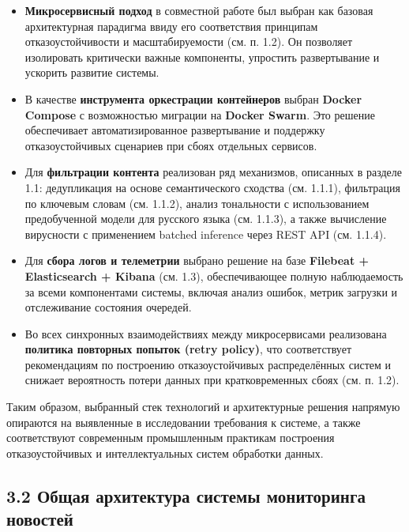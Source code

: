 \begin{itemize}
\tightlist
\item
  \textbf{Микросервисный подход} в совместной работе был выбран как
  базовая архитектурная парадигма ввиду его соответствия принципам
  отказоустойчивости и масштабируемости (см. п. 1.2). Он позволяет
  изолировать критически важные компоненты, упростить развертывание и
  ускорить развитие системы.\\
\item
  В качестве \textbf{инструмента оркестрации контейнеров} выбран
  \textbf{Docker Compose} с возможностью миграции на \textbf{Docker
  Swarm}. Это решение обеспечивает автоматизированное развертывание и
  поддержку отказоустойчивых сценариев при сбоях отдельных сервисов.\\
\item
  Для \textbf{фильтрации контента} реализован ряд механизмов, описанных
  в разделе 1.1: дедупликация на основе семантического сходства (см.
  1.1.1), фильтрация по ключевым словам (см. 1.1.2), анализ тональности
  с использованием предобученной модели для русского языка (см. 1.1.3),
  а также вычисление вирусности с применением batched inference через
  REST API (см. 1.1.4).\\
\item
  Для \textbf{сбора логов и телеметрии} выбрано решение на базе
  \textbf{Filebeat + Elasticsearch + Kibana} (см. 1.3), обеспечивающее
  полную наблюдаемость за всеми компонентами системы, включая анализ
  ошибок, метрик загрузки и отслеживание состояния очередей.\\
\item
  Во всех синхронных взаимодействиях между микросервисами реализована
  \textbf{политика повторных попыток (retry policy)}, что соответствует
  рекомендациям по построению отказоустойчивых распределённых систем и
  снижает вероятность потери данных при кратковременных сбоях (см. п.
  1.2).
\end{itemize}

Таким образом, выбранный стек технологий и архитектурные решения
напрямую опираются на выявленные в исследовании требования к системе, а
также соответствуют современным промышленным практикам построения
отказоустойчивых и интеллектуальных систем обработки данных.

\hypertarget{ux43eux431ux449ux430ux44f-ux430ux440ux445ux438ux442ux435ux43aux442ux443ux440ux430-ux441ux438ux441ux442ux435ux43cux44b-ux43cux43eux43dux438ux442ux43eux440ux438ux43dux433ux430-ux43dux43eux432ux43eux441ux442ux435ux439}{%
\subsection{3.2 Общая архитектура системы мониторинга
новостей}\label{ux43eux431ux449ux430ux44f-ux430ux440ux445ux438ux442ux435ux43aux442ux443ux440ux430-ux441ux438ux441ux442ux435ux43cux44b-ux43cux43eux43dux438ux442ux43eux440ux438ux43dux433ux430-ux43dux43eux432ux43eux441ux442ux435ux439}}

